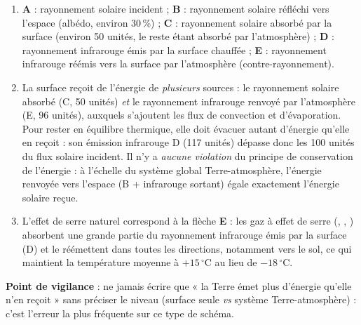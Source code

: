\documentclass[11pt]{article}
\begin{document}
\begin{corrige}
\begin{enumerate}
    \item \textbf{A} : rayonnement solaire incident ; \textbf{B} : rayonnement solaire réfléchi vers l'espace (albédo, environ 30\,\%) ; \textbf{C} : rayonnement solaire absorbé par la surface (environ 50 unités, le reste étant absorbé par l'atmosphère) ; \textbf{D} : rayonnement infrarouge émis par la surface chauffée ; \textbf{E} : rayonnement infrarouge réémis vers la surface par l'atmosphère (contre-rayonnement).
    \item La surface reçoit de l'énergie de \emph{plusieurs} sources : le rayonnement solaire absorbé (C, 50 unités) \emph{et} le rayonnement infrarouge renvoyé par l'atmosphère (E, 96 unités), auxquels s'ajoutent les flux de convection et d'évaporation. Pour rester en équilibre thermique, elle doit évacuer autant d'énergie qu'elle en reçoit : son émission infrarouge D (117 unités) dépasse donc les 100 unités du flux solaire incident. Il n'y a \emph{aucune violation} du principe de conservation de l'énergie : à l'échelle du système global Terre-atmosphère, l'énergie renvoyée vers l'espace (B + infrarouge sortant) égale exactement l'énergie solaire reçue.
    \item L'effet de serre naturel correspond à la flèche \textbf{E} : les gaz à effet de serre (, , ) absorbent une grande partie du rayonnement infrarouge émis par la surface (D) et le réémettent dans toutes les directions, notamment vers le sol, ce qui maintient la température moyenne à $+15\,^\circ$C au lieu de $-18\,^\circ$C.
\end{enumerate}
\textbf{Point de vigilance} : ne jamais écrire que « la Terre émet plus d'énergie qu'elle n'en reçoit » sans préciser le niveau (surface seule \emph{vs} système Terre-atmosphère) : c'est l'erreur la plus fréquente sur ce type de schéma.
\end{corrige}
\end{document}
